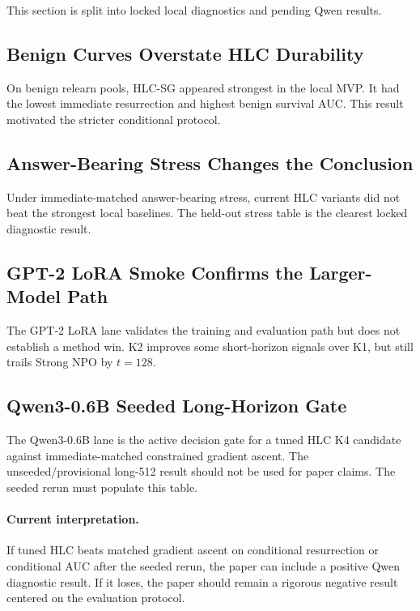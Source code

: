 This section is split into locked local diagnostics and pending Qwen results.

\subsection{Benign Curves Overstate HLC Durability}

On benign relearn pools, HLC-SG appeared strongest in the local MVP.
It had the lowest immediate resurrection and highest benign survival AUC.
This result motivated the stricter conditional protocol.



\subsection{Answer-Bearing Stress Changes the Conclusion}

Under immediate-matched answer-bearing stress, current HLC variants did not beat the strongest local baselines.
The held-out stress table is the clearest locked diagnostic result.



\subsection{GPT-2 LoRA Smoke Confirms the Larger-Model Path}

The GPT-2 LoRA lane validates the training and evaluation path but does not establish a method win.
K2 improves some short-horizon signals over K1, but still trails Strong NPO by $t=128$.



\subsection{Qwen3-0.6B Seeded Long-Horizon Gate}

The Qwen3-0.6B lane is the active decision gate for a tuned HLC K4 candidate against immediate-matched constrained gradient ascent.
The unseeded/provisional long-512 result should not be used for paper claims.
The seeded rerun must populate this table.



\paragraph{Current interpretation.}
If tuned HLC beats matched gradient ascent on conditional resurrection or conditional AUC after the seeded rerun, the paper can include a positive Qwen diagnostic result.
If it loses, the paper should remain a rigorous negative result centered on the evaluation protocol.
